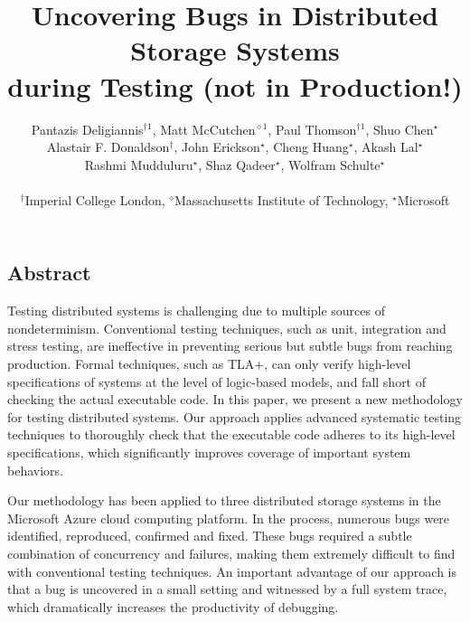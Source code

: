 \documentclass[letterpaper,twocolumn,10pt]{article}
\begin{document}
\date{}

\title{\Large \bf Uncovering Bugs in Distributed Storage Systems\\during Testing (not in Production!)}

\author{
{\rm Pantazis Deligiannis$^{\dagger1}$, Matt McCutchen$^{\diamond1}$, Paul Thomson$^{\dagger1}$, Shuo Chen$^\star$}\\
{\rm Alastair F. Donaldson$^\dagger$, John Erickson$^\star$, Cheng Huang$^\star$, Akash Lal$^\star$}\\
{\rm Rashmi Mudduluru$^\star$, Shaz Qadeer$^\star$, Wolfram Schulte$^\star$}\\\\
$^\dagger$Imperial College London, $^\diamond$Massachusetts Institute of Technology, $^\star$Microsoft\\
} %
\maketitle

\thispagestyle{empty}


\subsection*{Abstract}
Testing distributed systems is challenging due to multiple sources of nondeterminism. Conventional testing techniques, such as unit, integration and stress testing, are ineffective in preventing serious but subtle bugs from reaching production. Formal techniques, such as TLA+, can only verify high-level specifications of systems at the level of logic-based models, and fall short of checking the actual executable code. In this paper, we present a new methodology for testing distributed systems. Our approach applies advanced systematic testing techniques to thoroughly check that the executable code adheres to its high-level specifications, which significantly improves coverage of important system behaviors.

Our methodology has been applied to three distributed storage systems in the Microsoft Azure cloud computing platform. In the process, numerous bugs were identified, reproduced, confirmed and fixed. These bugs required a subtle combination of concurrency and failures, making them extremely difficult to find with conventional testing techniques. An important advantage of our approach is that a bug is uncovered in a small setting and witnessed by a full system trace, which dramatically increases the productivity of debugging.
\end{document}
